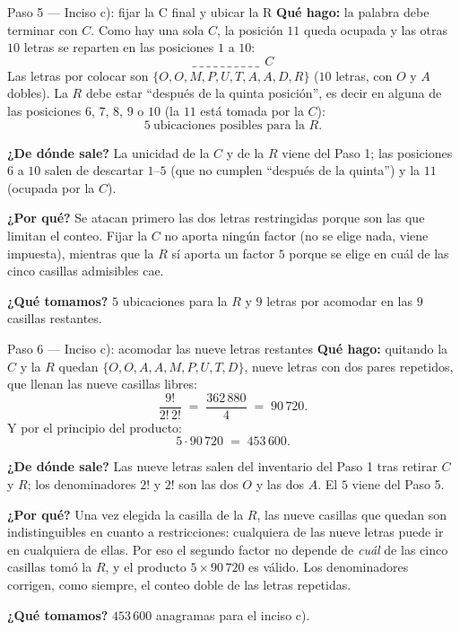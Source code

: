 \documentclass[11pt]{article}
\begin{document}
\begin{paso}{Paso 5 --- Inciso c): fijar la C final y ubicar la R}
\textbf{Qué hago:} la palabra debe terminar con $C$. Como hay una sola $C$, la posición $11$ queda ocupada y
las otras $10$ letras se reparten en las posiciones $1$ a $10$:
\[
\_\ \_\ \_\ \_\ \_\ \_\ \_\ \_\ \_\ \_\ \ C
\]
Las letras por colocar son $\{O,O,M,P,U,T,A,A,D,R\}$ ($10$ letras, con $O$ y $A$ dobles). La $R$ debe estar
``después de la quinta posición'', es decir en alguna de las posiciones $6$, $7$, $8$, $9$ o $10$ (la $11$
está tomada por la $C$):
\[
5 \ \text{ubicaciones posibles para la } R .
\]

\textbf{¿De dónde sale?} La unicidad de la $C$ y de la $R$ viene del Paso 1; las posiciones $6$ a $10$ salen
de descartar $1$--$5$ (que no cumplen ``después de la quinta'') y la $11$ (ocupada por la $C$).

\textbf{¿Por qué?} Se atacan primero las dos letras restringidas porque son las que limitan el conteo. Fijar
la $C$ no aporta ningún factor (no se elige nada, viene impuesta), mientras que la $R$ sí aporta un factor
$5$ porque se elige en cuál de las cinco casillas admisibles cae.

\textbf{¿Qué tomamos?} $5$ ubicaciones para la $R$ y $9$ letras por acomodar en las $9$ casillas restantes.
\end{paso}

\begin{paso}{Paso 6 --- Inciso c): acomodar las nueve letras restantes}
\textbf{Qué hago:} quitando la $C$ y la $R$ quedan $\{O,O,A,A,M,P,U,T,D\}$, nueve letras con dos pares
repetidos, que llenan las nueve casillas libres:
\[
\frac{9!}{2!\,2!} \;=\; \frac{362\,880}{4} \;=\; 90\,720 .
\]
Y por el principio del producto:
\[
5\cdot 90\,720 \;=\; 453\,600 .
\]

\textbf{¿De dónde sale?} Las nueve letras salen del inventario del Paso 1 tras retirar $C$ y $R$; los
denominadores $2!$ y $2!$ son las dos $O$ y las dos $A$. El $5$ viene del Paso 5.

\textbf{¿Por qué?} Una vez elegida la casilla de la $R$, las nueve casillas que quedan son
indistinguibles en cuanto a restricciones: cualquiera de las nueve letras puede ir en cualquiera de ellas.
Por eso el segundo factor no depende de \emph{cuál} de las cinco casillas tomó la $R$, y el producto
$5\times 90\,720$ es válido. Los denominadores corrigen, como siempre, el conteo doble de las letras
repetidas.

\textbf{¿Qué tomamos?} $453\,600$ anagramas para el inciso c).
\end{paso}
\end{document}
